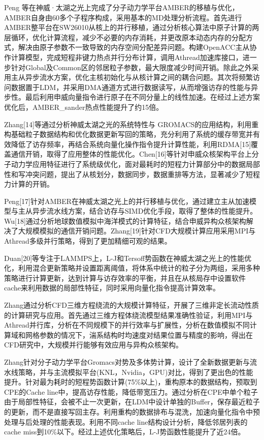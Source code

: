 Peng 等在神威·太湖之光上完成了分子动力学平台AMBER的移植与优化，AMBER自身由60多个子程序构成，采用基本的MD处理分析流程。首先进行AMBER整平台在SW26010从核上的并行移植，通过分析核心算法中原子计算的两层循环，优化计算流程，减少不必要的内存消耗，并更改原本动态内存的分配方式，解决由原子参数不一致导致的内存空间分配差异问题。构建OpenACC主从协作计算模型，完成短程非键力热点并行分布计算，调用Athread加速库接口，进一步针对Global及Common区的邻居粒子参数，最大限度减少时间开销。除此之外采用主从异步流水方案，优化主核初始化与从核计算之间的耦合问题。其次将频繁访问数据置于LDM，并采用DMA通道方式进行数据读写，从而增强访存的性能与异步性。最后利用申威向量指令进行原子在不同分量上的线性加速。在经过上述方案优化后，AMBER\_sander热点性能提升了约15倍。

Zhang[14]等通过分析神威太湖之光的系统特性与 GROMACS的应用结构，利用重构基础粒子数据结构和优化数据更新写回的策略，充分利用了系统的缓存带宽并有效降低了访存频率，再结合系统向量化操作指令提升计算性能，利用RDMA[15]覆盖通信开销，取得了应用整体的性能优化。Chen[16]等针对申威众核架构平台上分子动力学应用特征进行了系统级优化，面对最耗时的短程力计算部分中的数据局部性和写冲突问题，提出了从核划分，数据同步，数据重排等方法，显著减少了短程力计算的开销。

Peng[17]针对AMBER在神威太湖之光上的并行移植与优化，通过建立主从加速模型与主从异步流水线方案，结合访存与SIMD优化手段，取得了整体的性能提升。Wu[18]通过分析地球数值模拟中海洋模式的计算特征，结合申威异构众核架构解决了大规模模拟的通信开销问题。Zhang[19]针对CFD大规模计算应用采用MPI与Athread多级并行策略，得到了更加精细可观的结果。

Duan[20]等专注于LAMMPS上，L-J和Tersoff势函数在神威太湖之光上的性能优化，利用混合更新策略并设置距离阈值，将体系中统计的粒子分为两组，采用多种策略进行计算更新，达到计算与访存效率的平衡，并且在从核局存中设置软件cache来利用数据的局部性特征，同时采用向量化指令提高计算效率。

Zhang通过分析CFD三维方程绕流的大规模计算特征，开展了三维非定长流动性质的计算研究与应用。首先通过三维方程体绕流模型结果准确性验证，利用MPI与Athread并行库，分析在不同规模下的并行效率与扩展性，分析在数值模拟不同计算域和网格参数的情况下，湍系结构时均速度对结果位置与精度的影响，得出在CFD研究中，大规模并行能够有效应用与异构众核架构。

Zhang针对分子动力学平台Gromacs对势及多体势计算，设计了全新数据更新与流水线策略，并与主流模拟平台(KNL，Nvidia，GPU)对比，得到了更出色的性能提升。针对最为耗时的短程势函数计算(75\%以上)，重构原本的数据结构，预取到CPE的Cache line中，提高访存性能，降低带宽压力。通过分析在CPE中单个粒子由于局部性特征，会被不止一次更新，在LDM中设计单独的Buffer，保存最近粒子的更新，而不是直接写回主存。利用重构的数据排布与混洗，加速向量化指令中预处理与后处理的性能表现。利用不同cache line结构设计分析，降低邻居列表的cache miss到10\%以下。经过上述优化策略后，L-J势函数性能提升了近24倍。


